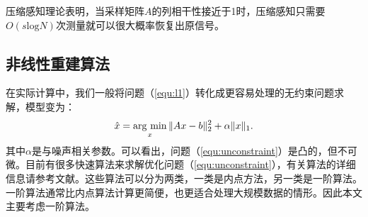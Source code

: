 压缩感知理论表明，当采样矩阵$A$的列相干性接近于1时，压缩感知只需要$O(s\mathrm{log}N)$次测量就可以很大概率恢复出原信号。

\subsection{非线性重建算法}
在实际计算中，我们一般将问题（\ref{equ:l1}）转化成更容易处理的无约束问题求解，模型变为：
\begin{equation}
	\hat{x}=\argmin_x \|Ax-b\|_2^2 + \alpha\|x\|_1.
	\label{equ:unconstraint}
\end{equation}
其中$\alpha$是与噪声相关参数。可以看出，问题（\ref{equ:unconstraint}）是凸的，但不可微。目前有很多快速算法来求解优化问题（\ref{equ:unconstraint}），有关算法的详细信息请参考文献\cite{proximal}。这些算法可以分为两类，一类是内点方法，另一类是一阶算法。一阶算法通常比内点算法计算更简便，也更适合处理大规模数据的情形。因此本文主要考虑一阶算法。

